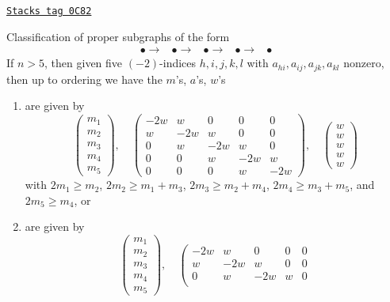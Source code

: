 \begin{lemma}
\label{models-lemma-five-by-five}
\href{https://stacks.math.columbia.edu/tag/0C82}{\texttt{Stacks tag 0C82}}

Classification of proper subgraphs of the form
$$
\begin{array}{ccccc}\bullet \longrightarrow & \bullet \longrightarrow & \bullet \longrightarrow & \bullet \longrightarrow & \bullet\end{array}
$$
If $n > 5$, then given five $(-2)$-indices $h, i, j, k, l$
with $a_{hi}, a_{ij}, a_{jk}, a_{kl}$ nonzero, then up
to ordering we have the $m$'s, $a$'s, $w$'s
\begin{enumerate}
\item
\label{models-item-A5}
are given by
$$
\left(
\begin{matrix}
m_1 \\
m_2 \\
m_3 \\
m_4 \\
m_5
\end{matrix}
\right),
\quad
\left(
\begin{matrix}
-2w & w & 0 & 0 & 0 \\
w & -2w & w & 0 & 0 \\
0 & w & -2w & w & 0 \\
0 & 0 & w & -2w & w \\
0 & 0 & 0 & w & -2w
\end{matrix}
\right),
\quad
\left(
\begin{matrix}
w \\
w \\
w \\
w \\
w
\end{matrix}
\right)
$$
with $2m_1 \geq m_2$, $2m_2 \geq m_1 + m_3$, $2m_3 \geq m_2 + m_4$,
$2m_4 \geq m_3 + m_5$, and $2m_5 \geq m_4$, or
\item
\label{models-item-C5}
are given by
$$
\left(
\begin{matrix}
m_1 \\
m_2 \\
m_3 \\
m_4 \\
m_5
\end{matrix}
\right),
\quad
\left(
\begin{matrix}
-2w & w & 0 & 0 & 0 \\
w & -2w & w & 0 & 0 \\
0 & w & -2w & w & 0 \\

\end{matrix}$$
\end{enumerate}
\end{lemma}
